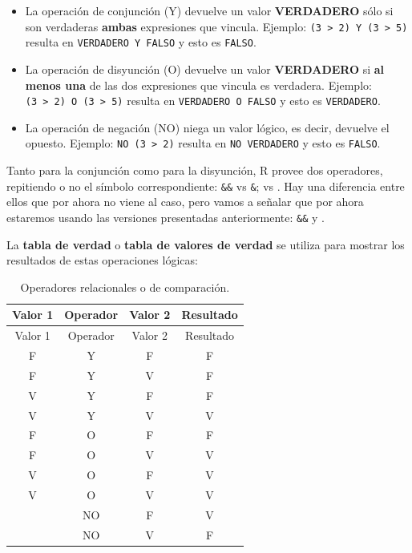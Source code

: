 \documentclass[
]{book}
\providecommand{\tightlist}{%
  \setlength{\itemsep}{0pt}\setlength{\parskip}{0pt}}
\begin{document}
\begin{itemize}
\tightlist
\item
  La operación de conjunción (Y) devuelve un valor \textbf{VERDADERO} sólo si son verdaderas \textbf{ambas} expresiones que vincula. Ejemplo: \texttt{(3\ \textgreater{}\ 2)\ Y\ (3\ \textgreater{}\ 5)} resulta en \texttt{VERDADERO\ Y\ FALSO} y esto es \texttt{FALSO}.
\item
  La operación de disyunción (O) devuelve un valor \textbf{VERDADERO} si \textbf{al menos una} de las dos expresiones que vincula es verdadera. Ejemplo: \texttt{(3\ \textgreater{}\ 2)\ O\ (3\ \textgreater{}\ 5)} resulta en \texttt{VERDADERO\ O\ FALSO} y esto es \texttt{VERDADERO}.
\item
  La operación de negación (NO) niega un valor lógico, es decir, devuelve el opuesto. Ejemplo: \texttt{NO\ (3\ \textgreater{}\ 2)} resulta en \texttt{NO\ VERDADERO} y esto es \texttt{FALSO}.
\end{itemize}

Tanto para la conjunción como para la disyunción, R provee dos operadores, repitiendo o no el símbolo correspondiente: \texttt{\&\&} vs \texttt{\&}; \texttt{\textbar{}\textbar{}} vs \texttt{\textbar{}}. Hay una diferencia entre ellos que por ahora no viene al caso, pero vamos a señalar que por ahora estaremos usando las versiones presentadas anteriormente: \texttt{\&\&} y \texttt{\textbar{}\textbar{}}.

La \textbf{tabla de verdad} o \textbf{tabla de valores de verdad} se utiliza para mostrar los resultados de estas operaciones lógicas:

\begin{longtable}[]{@{}cccc@{}}
\caption{\label{tab:verdad} Operadores relacionales o de comparación.}\tabularnewline
\toprule
Valor 1 & Operador & Valor 2 & Resultado \\
\midrule
\endfirsthead
\toprule
Valor 1 & Operador & Valor 2 & Resultado \\
\midrule
\endhead
F & Y & F & F \\
F & Y & V & F \\
V & Y & F & F \\
V & Y & V & V \\
F & O & F & F \\
F & O & V & V \\
V & O & F & V \\
V & O & V & V \\
& NO & F & V \\
& NO & V & F \\
\bottomrule
\end{longtable}
\end{document}
